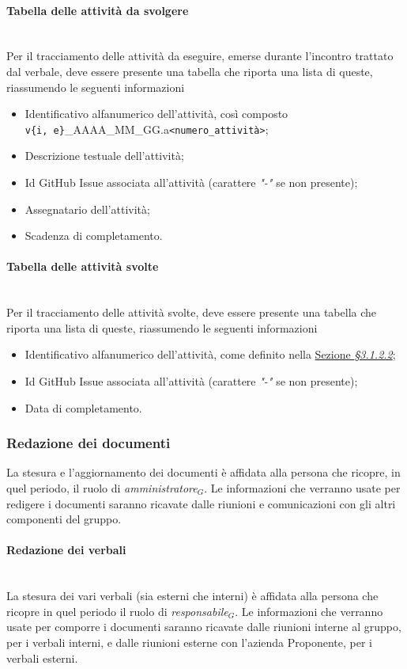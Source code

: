 \documentclass[10pt, letterpaper]{article}
\newcommand{\trisubsection}[1]{\paragraph{#1}\mbox{}\\}
\begin{document}
\label{sec:TabellaToDo}
\trisubsection{Tabella delle attività da svolgere}
Per il tracciamento delle attività da eseguire, emerse durante l'incontro trattato dal verbale, deve essere presente una tabella che riporta una lista di queste, riassumendo le seguenti informazioni
\begin{itemize}
    \item Identificativo alfanumerico dell'attività, così composto\\ \texttt{v\{i, e\}}\_AAAA\_MM\_GG.a\texttt{<numero\_attività>};
    \item Descrizione testuale dell'attività;
    \item Id GitHub Issue associata all'attività (carattere \textit{"-"} se non presente);
    \item Assegnatario dell'attività;
    \item Scadenza di completamento.
\end{itemize}

\label{sec:TabellaDone}
\trisubsection{Tabella delle attività svolte}
Per il tracciamento delle attività svolte, deve essere presente una tabella che riporta una lista di queste, riassumendo le seguenti informazioni
\begin{itemize}
    \item Identificativo alfanumerico dell'attività, come definito nella \hyperref[sec:TabellaToDo]{Sezione \textit{§3.1.2.2}};
    \item Id GitHub Issue associata all'attività (carattere \textit{"-"} se non presente);
    \item Data di completamento.
\end{itemize}



\subsubsection{Redazione dei documenti}
La stesura e l'aggiornamento dei documenti è affidata alla persona che ricopre, in quel periodo, il ruolo di \textit{amministratore$_{G}$}. Le informazioni che verranno usate per redigere i documenti saranno ricavate dalle riunioni e comunicazioni con gli altri componenti del gruppo.

\trisubsection{Redazione dei verbali}
La stesura dei vari verbali (sia esterni che interni) è affidata alla persona che ricopre in quel periodo il ruolo di \textit{responsabile$_{G}$}. Le informazioni che verranno usate per comporre i documenti saranno ricavate dalle riunioni interne al gruppo, per i verbali interni, e dalle riunioni esterne con l'azienda Proponente, per i verbali esterni.
\end{document}
